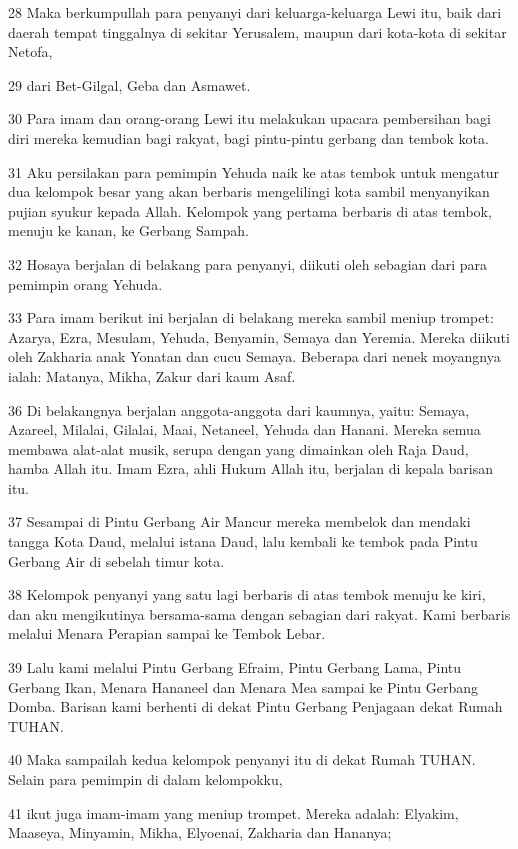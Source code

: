 \par 28 Maka berkumpullah para penyanyi dari keluarga-keluarga Lewi itu, baik dari daerah tempat tinggalnya di sekitar Yerusalem, maupun dari kota-kota di sekitar Netofa,
\par 29 dari Bet-Gilgal, Geba dan Asmawet.
\par 30 Para imam dan orang-orang Lewi itu melakukan upacara pembersihan bagi diri mereka kemudian bagi rakyat, bagi pintu-pintu gerbang dan tembok kota.
\par 31 Aku persilakan para pemimpin Yehuda naik ke atas tembok untuk mengatur dua kelompok besar yang akan berbaris mengelilingi kota sambil menyanyikan pujian syukur kepada Allah. Kelompok yang pertama berbaris di atas tembok, menuju ke kanan, ke Gerbang Sampah.
\par 32 Hosaya berjalan di belakang para penyanyi, diikuti oleh sebagian dari para pemimpin orang Yehuda.
\par 33 Para imam berikut ini berjalan di belakang mereka sambil meniup trompet: Azarya, Ezra, Mesulam, Yehuda, Benyamin, Semaya dan Yeremia. Mereka diikuti oleh Zakharia anak Yonatan dan cucu Semaya. Beberapa dari nenek moyangnya ialah: Matanya, Mikha, Zakur dari kaum Asaf.
\par 36 Di belakangnya berjalan anggota-anggota dari kaumnya, yaitu: Semaya, Azareel, Milalai, Gilalai, Maai, Netaneel, Yehuda dan Hanani. Mereka semua membawa alat-alat musik, serupa dengan yang dimainkan oleh Raja Daud, hamba Allah itu. Imam Ezra, ahli Hukum Allah itu, berjalan di kepala barisan itu.
\par 37 Sesampai di Pintu Gerbang Air Mancur mereka membelok dan mendaki tangga Kota Daud, melalui istana Daud, lalu kembali ke tembok pada Pintu Gerbang Air di sebelah timur kota.
\par 38 Kelompok penyanyi yang satu lagi berbaris di atas tembok menuju ke kiri, dan aku mengikutinya bersama-sama dengan sebagian dari rakyat. Kami berbaris melalui Menara Perapian sampai ke Tembok Lebar.
\par 39 Lalu kami melalui Pintu Gerbang Efraim, Pintu Gerbang Lama, Pintu Gerbang Ikan, Menara Hananeel dan Menara Mea sampai ke Pintu Gerbang Domba. Barisan kami berhenti di dekat Pintu Gerbang Penjagaan dekat Rumah TUHAN.
\par 40 Maka sampailah kedua kelompok penyanyi itu di dekat Rumah TUHAN. Selain para pemimpin di dalam kelompokku,
\par 41 ikut juga imam-imam yang meniup trompet. Mereka adalah: Elyakim, Maaseya, Minyamin, Mikha, Elyoenai, Zakharia dan Hananya;
